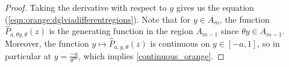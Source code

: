 \documentclass[12pt]{article}
\newcommand{\1}{\mathds{1}}
\renewcommand{\d}{\mathrm{d}}
\theoremstyle{definition}
\theoremstyle{plain}
\theoremstyle{remark}
\begin{document}
\begin{proof}
 Taking the derivative with respect to $y$ gives us the equation (\ref{eqn:orange:dglviadifferentregions}).
Note that for $y\in A_m$, the function $\hat{P}_{a,\theta y,\theta}(z)$ is the generating function in the region $A_{m-1}$ since $\theta y\in A_{m-1}$. Moreover, the function
$y\mapsto\hat{P}_{a,y,\theta}(z)$ is continuous on $y\in[-a,1]$, so in particular at $y=\frac{-a}{\theta^{m}}$, which implies \eqref{continuous_orange}.
\end{proof}
\end{document}
